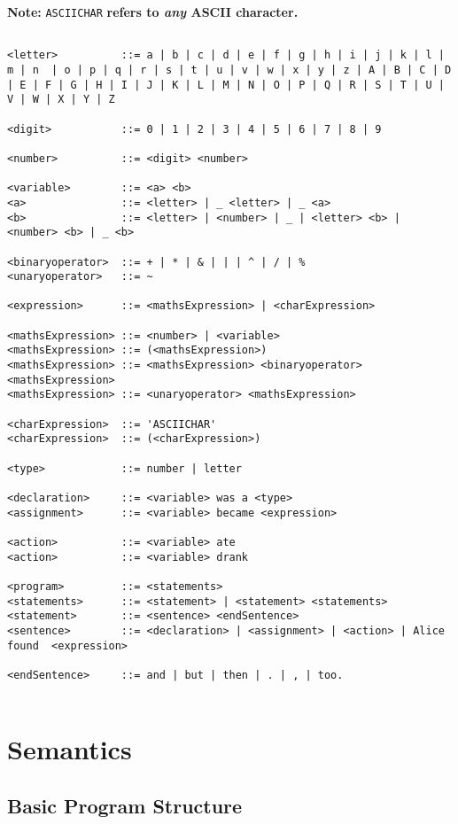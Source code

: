 \documentclass[a4wide, 10pt]{article}
\begin{document}
\textbf{Note: }\verb+ASCIICHAR+\textbf{ refers to \emph{any} ASCII character.}
\begin{lstlisting}

<letter>          ::= a | b | c | d | e | f | g | h | i | j | k | l | m | n  | o | p | q | r | s | t | u | v | w | x | y | z | A | B | C | D | E | F | G | H | I | J | K | L | M | N | O | P | Q | R | S | T | U | V | W | X | Y | Z
               
<digit>           ::= 0 | 1 | 2 | 3 | 4 | 5 | 6 | 7 | 8 | 9

<number>          ::= <digit> <number>

<variable>        ::= <a> <b>
<a>               ::= <letter> | _ <letter> | _ <a>
<b>               ::= <letter> | <number> | _ | <letter> <b> | <number> <b> | _ <b>

<binaryoperator>  ::= + | * | & | | | ^ | / | %
<unaryoperator>   ::= ~

<expression>      ::= <mathsExpression> | <charExpression>

<mathsExpression> ::= <number> | <variable>
<mathsExpression> ::= (<mathsExpression>)
<mathsExpression> ::= <mathsExpression> <binaryoperator> <mathsExpression>
<mathsExpression> ::= <unaryoperator> <mathsExpression>

<charExpression>  ::= 'ASCIICHAR'
<charExpression>  ::= (<charExpression>)

<type>            ::= number | letter

<declaration>     ::= <variable> was a <type>
<assignment>      ::= <variable> became <expression>

<action>          ::= <variable> ate
<action>          ::= <variable> drank

<program>         ::= <statements>
<statements>      ::= <statement> | <statement> <statements>
<statement>       ::= <sentence> <endSentence>
<sentence>        ::= <declaration> | <assignment> | <action> | Alice found  <expression>

<endSentence>     ::= and | but | then | . | , | too.
    
\end{lstlisting}

\section{Semantics}

\subsection{Basic Program Structure}
\end{document}
